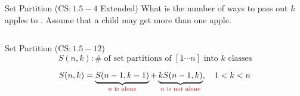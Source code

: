 
\begin{frame}{}
  \begin{exampleblock}{Set Partition ($\text{CS}: 1.5-4$ Extended)}
    What is the number of ways to pass out $k$  apples to . 
    Assume that a child may get more than one apple.
  \end{exampleblock}

  \pause

  \begin{columns}
    \pause
    \pause
  \end{columns}

  \pause
  \vspace{0.50cm}
  \centerline{}
\end{frame}

\begin{frame}{}
  \begin{exampleblock}{Set Partition ($\text{CS}: 1.5-12$)}
    \[
      S(n,k): \#\; \text{of set partitions of $[1 \cdots n]$ into $k$ classes}
    \]
  \end{exampleblock}

  \pause
  \vspace{0.30cm}
  \[
    S(n,k) = \underbrace{S(n-1, k-1)}_{\text{\textcolor{red}{$n$ is alone}}} + \underbrace{k S(n-1, k)}_{\text{\textcolor{red}{$n$ is not alone}}}, \quad 1 < k < n
  \]
\end{frame}
